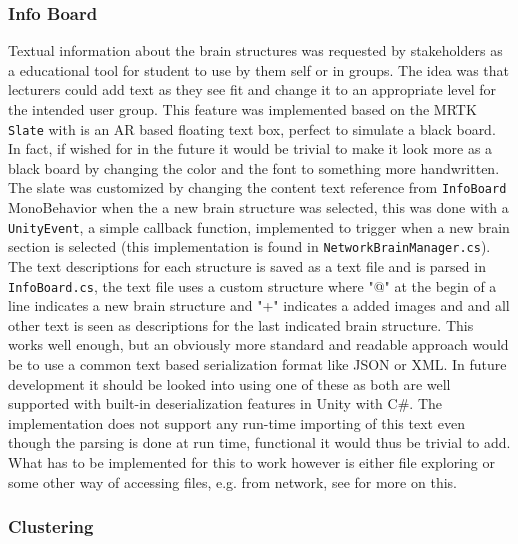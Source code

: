 \subsubsection*{Info Board}
Textual information about the brain structures was requested by stakeholders as a educational tool for student to use by them self or in groups. The idea was that lecturers could add text as they see fit and change it to an appropriate level for the intended user group. 
This feature was implemented based on the MRTK \texttt{Slate} with is an AR based floating text box, perfect to simulate a black board. In fact, if wished for in the future it would be trivial to make it look more as a black board by changing the color and the font to something more handwritten.
The slate was customized by changing the content text reference from \texttt{InfoBoard} MonoBehavior when the a new brain structure was selected, this was done with a \texttt{UnityEvent}, a simple callback function, implemented to trigger when a new brain section is selected (this implementation
 is found in \texttt{NetworkBrainManager.cs}). The text descriptions for each structure is saved as a text file and is parsed in \texttt{InfoBoard.cs}, the text file uses a custom structure where "@" at the begin of a line indicates a new brain structure and "+" indicates a added images and and all other text is seen as descriptions for the last indicated brain structure. This works well enough, but an obviously more standard and readable approach would be to use a common text based serialization format like JSON or XML. In future development it should be looked into using one of these as both are well supported with built-in deserialization features in Unity with C\#. The implementation does not support any run-time importing of this text even though the parsing is done at run time, functional it would thus be trivial to add. What has to be implemented for this to work however is either file exploring or some other way of accessing files, e.g. from network, see  for more on this.

\subsubsection*{Clustering}

